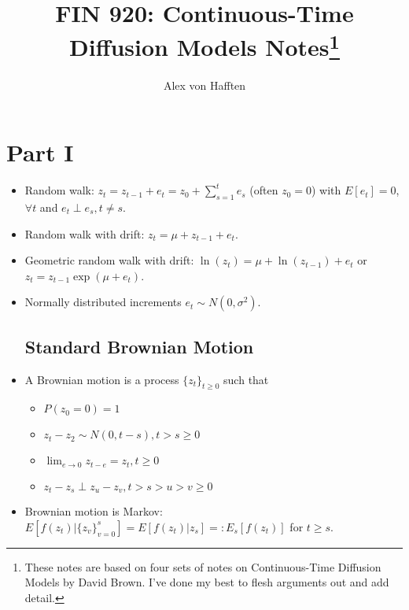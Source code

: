 \documentclass{article}
\title{FIN 920: Continuous-Time Diffusion Models Notes\footnote{These notes are based on four sets of notes on Continuous-Time Diffusion Models by David Brown. I've done my best to flesh arguments out and add detail.}}
\author{Alex von Hafften}
\begin{document}
\maketitle

\section{Part I}

\begin{itemize}

\subsection*{(Discrete) Random Walks}

\item Random walk: $z_t = z_{t-1} + e_t = z_0 + \sum_{s=1}^t e_s$ (often $z_0 = 0$) with $E[e_t] = 0$, $\forall t$ and $e_t \perp e_s, t \neq s$.

\item Random walk with drift: $z_t = \mu + z_{t-1} + e_t$.

\item Geometric random walk with drift: $\ln(z_t) = \mu + \ln(z_{t-1}) + e_t$ or $z_t = z_{t-1} \exp(\mu + e_t)$.

\item Normally distributed increments $e_t \sim N(0, \sigma^2)$.

\subsection*{Standard Brownian Motion}

\item A Brownian motion is a process $\{z_t\}_{t \ge 0}$ such that

\begin{itemize}

\item $P(z_0 = 0) = 1$
\item $z_t - z_2 \sim N(0, t-s), t>s \ge 0$
\item $\lim_{e \to 0} z_{t-e} = z_t, t \ge 0$
\item $z_t - z_s \perp z_u - z_v, t >s>u>v\ge 0$

\end{itemize}

\item Brownian motion is Markov: $E[f(z_t) | \{z_v\}_{v=0}^s] =E[f(z_t) | z_s]=:E_s[f(z_t)]$ for $t \ge s$.


\end{itemize}
\end{document}
